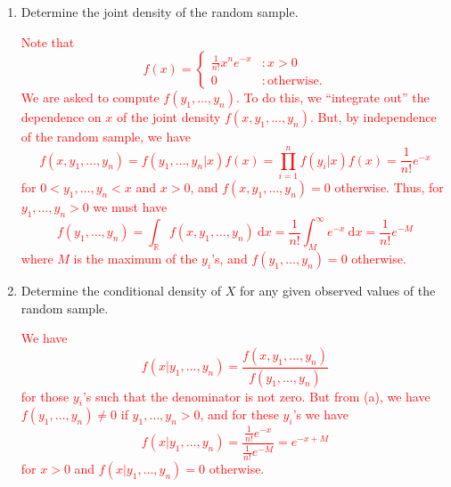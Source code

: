 \documentclass[12pt,reqno]{amsart}
\begin{document}
\medskip
\begin{enumerate}
\item Determine the joint density of the random sample.

\bigskip
\textcolor{red}{Note that
	\[
	f(x) = \begin{cases}
	\frac{1}{n!} x^n e^{-x} & : x>0\\
	0 & : \text{otherwise}.
	\end{cases}
	\]
We are asked to compute $f(y_1,\ldots,y_n)$. To do this, we ``integrate out'' the dependence on $x$ of the joint density $f(x,y_1,\ldots,y_n)$. But, by independence of the random sample, we have
	\[
	f(x,y_1,\ldots,y_n) = f(y_1,\ldots,y_n|x)f(x) = \prod_{i=1}^n f(y_i|x)f(x) = \frac{1}{n! } e^{-x}
	\]
for $0<y_1,\ldots,y_n<x$ and $x>0$, and $f(x,y_1,\ldots,y_n)=0$ otherwise. Thus, for $y_1,\ldots,y_n>0$ we must have
	\[
	f(y_1,\ldots,y_n) = \int_{\mathbb{R}} f(x,y_1,\ldots,y_n)  \ \text{d}x = \frac{1}{n!} \int_{M}^\infty e^{-x} \ \text{d}x = \frac{1}{n!}e^{-M}
	\]
where $M$ is the maximum of the $y_i$'s, and $f(y_1,\ldots,y_n)=0$ otherwise.}
\bigskip

\item Determine the conditional density of $X$ for any given observed values of the random sample.

\bigskip
\textcolor{red}{We have
	\[
	f(x|y_1,\ldots,y_n) = \frac{f(x,y_1,\ldots,y_n)}{f(y_1,\ldots,y_n)}
	\]
for those $y_i$'s such that the denominator is not zero. But from (a), we have $f(y_1,\ldots,y_n)\neq 0$ if $y_1,\ldots,y_n>0$, and for these $y_i$'s we have
	\[
	f(x|y_1,\ldots,y_n) = \frac{\frac{1}{n!}e^{-x}}{\frac{1}{n!}e^{-M}} = e^{-x+M}
	\]
for $x>0$ and $f(x|y_1,\ldots,y_n)=0$ otherwise.}
\end{enumerate}
\end{document}
